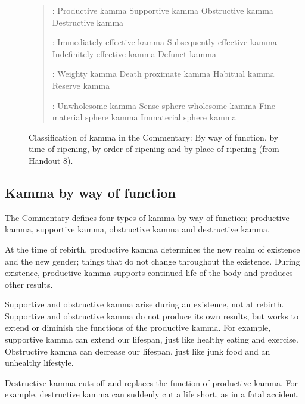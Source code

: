 \begin{figure}[h]
\begin{quote}
:  Productive kamma  Supportive kamma  Obstructive kamma  Destructive kamma

:  Immediately effective kamma  Subsequently effective kamma  Indefinitely effective kamma  Defunct kamma

:  Weighty kamma  Death proximate kamma  Habitual kamma  Reserve kamma

:  Unwholesome kamma  Sense sphere wholesome kamma  Fine material sphere kamma  Immaterial sphere kamma

\end{quote}


\caption{Classification of kamma in the Commentary: By way of function, by time of ripening, by order of ripening and by place of ripening (from Handout 8).}
\label{fig:Classifications}
\end{figure}

\subsection*{Kamma by way of function}

The Commentary defines four types of kamma by way of function; productive kamma, supportive kamma, obstructive kamma and destructive kamma.

At the time of rebirth, productive kamma determines the new realm of existence and the new gender; things that do not change throughout the existence. During existence, productive kamma supports continued life of the body and produces other results.

Supportive and obstructive kamma arise during an existence, not at rebirth. Supportive and obstructive kamma do not produce its own results, but works to extend or diminish the functions of the productive kamma. For example, supportive kamma can extend our lifespan, just like healthy eating and exercise. Obstructive kamma can decrease our lifespan, just like junk food and an unhealthy lifestyle.

Destructive kamma cuts off and replaces the function of productive kamma. For example, destructive kamma can suddenly cut a life short, as in a fatal accident.

